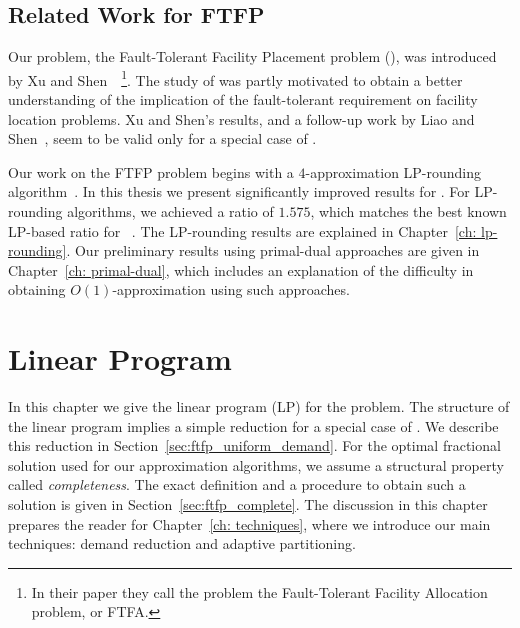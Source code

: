 \documentclass[oneside,final]{ucr}
\begin{document}
\section{Related Work for FTFP}
Our problem, the Fault-Tolerant Facility Placement problem
(\FTFP), was introduced by Xu and
Shen~\cite{XuS09}~\footnote{In their paper they call the
  problem the Fault-Tolerant Facility Allocation problem, or
  FTFA.}. The study of {\FTFP} was partly motivated to
obtain a better understanding of the implication of the
fault-tolerant requirement on facility location problems.
Xu and Shen's results, and a follow-up work by Liao and
Shen~\cite{LiaoS11}, seem to be valid only for a special
case of {\FTFP}.

Our work on the FTFP problem begins with a $4$-approximation
LP-rounding algorithm~\cite{YanC11}. In this thesis we
present significantly improved results for {\FTFP}. For
LP-rounding algorithms, we achieved a ratio of $1.575$,
which matches the best known LP-based ratio for
{\UFL}~\cite{ByrkaGS10}. The LP-rounding results are
explained in Chapter~\ref{ch: lp-rounding}. Our preliminary
results using primal-dual approaches are given in
Chapter~\ref{ch: primal-dual}, which includes an explanation
of the difficulty in obtaining $O(1)$-approximation using
such approaches.


\chapter{Linear Program} \label{ch: lp} 

In this chapter we give the linear program (LP) for the
{\FTFP} problem. The structure of the linear program implies
a simple reduction for a special case of {\FTFP}. We
describe this reduction in
Section~\ref{sec:ftfp_uniform_demand}. For the optimal
fractional solution used for our approximation algorithms,
we assume a structural property called
\emph{completeness}. The exact definition and a procedure to
obtain such a solution is given in
Section~\ref{sec:ftfp_complete}. The discussion in this
chapter prepares the reader for Chapter~\ref{ch:
  techniques}, where we introduce our main techniques:
demand reduction and adaptive partitioning.
\end{document}
